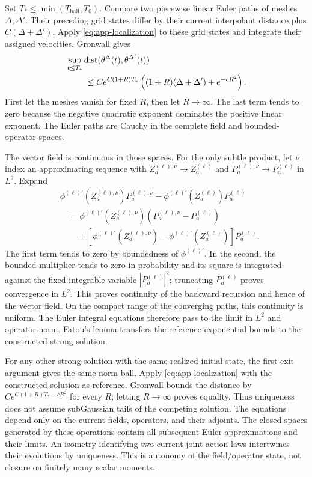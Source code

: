 Set $T_*\le\min(T_{\mathrm{ball}},T_0)$.  Compare two piecewise linear
Euler paths of meshes $\Delta,\Delta'$.  Their preceding grid states
differ by their current interpolant distance plus
$C(\Delta+\Delta')$.  Apply \eqref{eq:app-localization} to these grid
states and integrate their assigned velocities.  Gronwall gives
\begin{align*}
 &\sup_{t\le T_*}
 \operatorname{dist}(\theta^\Delta(t),\theta^{\Delta'}(t))\\
 &\hspace{8mm}\le
 Ce^{C(1+R)T_*}
 \left((1+R)(\Delta+\Delta')+e^{-cR^2}\right).
\end{align*}
First let the meshes vanish for fixed $R$, then let $R\to\infty$.
The last term tends to zero because the negative quadratic exponent
dominates the positive linear exponent.  The Euler paths are Cauchy in
the complete field and bounded-operator spaces.

The vector field is continuous in those spaces.  For the only subtle
product, let $\nu$ index an approximating sequence with
$Z_a^{(\ell),\nu}\to Z_a^{(\ell)}$ and
$P_a^{(\ell),\nu}\to P_a^{(\ell)}$ in $L^2$.  Expand
\begin{align*}
 &\phi^{(\ell)\prime}(Z_a^{(\ell),\nu})P_a^{(\ell),\nu}
      -\phi^{(\ell)\prime}(Z_a^{(\ell)})P_a^{(\ell)}\\
 &\quad=\phi^{(\ell)\prime}(Z_a^{(\ell),\nu})
                           (P_a^{(\ell),\nu}-P_a^{(\ell)})\\
 &\qquad+[\phi^{(\ell)\prime}(Z_a^{(\ell),\nu})
       -\phi^{(\ell)\prime}(Z_a^{(\ell)})]P_a^{(\ell)}.
\end{align*}
The first term tends to zero by boundedness of
$\phi^{(\ell)\prime}$.  In the second,
the bounded multiplier tends to zero in probability and its square is
integrated against the fixed integrable variable $|P_a^{(\ell)}|^2$;
truncating $P_a^{(\ell)}$
proves convergence in $L^2$.  This proves continuity of the backward
recursion and hence of the vector field.  On the compact range of the
converging paths, this continuity is uniform.  The Euler integral
equations therefore pass to the limit in $L^2$ and operator norm.
Fatou's lemma transfers the reference exponential bounds to the
constructed strong solution.

For any other strong solution with the same realized initial state,
the first-exit argument gives the same norm ball.  Apply
\eqref{eq:app-localization} with the constructed solution as reference.
Gronwall bounds the distance by $Ce^{C(1+R)T_*-cR^2}$ for every $R$;
letting $R\to\infty$ proves equality.  Thus uniqueness does not assume
subGaussian tails of the competing solution.  The equations depend
only on the current fields, operators, and their adjoints.  The closed
spaces generated by these operations contain all subsequent Euler
approximations and their limits.  An isometry identifying two current
joint action laws intertwines their evolutions by uniqueness.  This is
autonomy of the field/operator state, not closure on finitely many
scalar moments.

